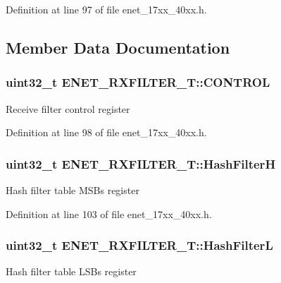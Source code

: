 Definition at line 97 of file enet\+\_\+17xx\+\_\+40xx.\+h.



\subsection{Member Data Documentation}
\subsubsection[{\texorpdfstring{C\+O\+N\+T\+R\+OL}{CONTROL}}]{ uint32\+\_\+t E\+N\+E\+T\+\_\+\+R\+X\+F\+I\+L\+T\+E\+R\+\_\+\+T\+::\+C\+O\+N\+T\+R\+OL}\hypertarget{structENET__RXFILTER__T_a41f07a3db2876b8d2ad5da9a93dfc26b}{}\label{structENET__RXFILTER__T_a41f07a3db2876b8d2ad5da9a93dfc26b}
Receive filter control register 

Definition at line 98 of file enet\+\_\+17xx\+\_\+40xx.\+h.

\subsubsection[{\texorpdfstring{Hash\+FilterH}{HashFilterH}}]{ uint32\+\_\+t E\+N\+E\+T\+\_\+\+R\+X\+F\+I\+L\+T\+E\+R\+\_\+\+T\+::\+Hash\+FilterH}\hypertarget{structENET__RXFILTER__T_a2d82ff2319b5b50a63698fd062c2fe7d}{}\label{structENET__RXFILTER__T_a2d82ff2319b5b50a63698fd062c2fe7d}
Hash filter table M\+S\+Bs register 

Definition at line 103 of file enet\+\_\+17xx\+\_\+40xx.\+h.

\subsubsection[{\texorpdfstring{Hash\+FilterL}{HashFilterL}}]{ uint32\+\_\+t E\+N\+E\+T\+\_\+\+R\+X\+F\+I\+L\+T\+E\+R\+\_\+\+T\+::\+Hash\+FilterL}\hypertarget{structENET__RXFILTER__T_ad011f3c2f5381b81e57c42420bb98644}{}\label{structENET__RXFILTER__T_ad011f3c2f5381b81e57c42420bb98644}
Hash filter table L\+S\+Bs register 

